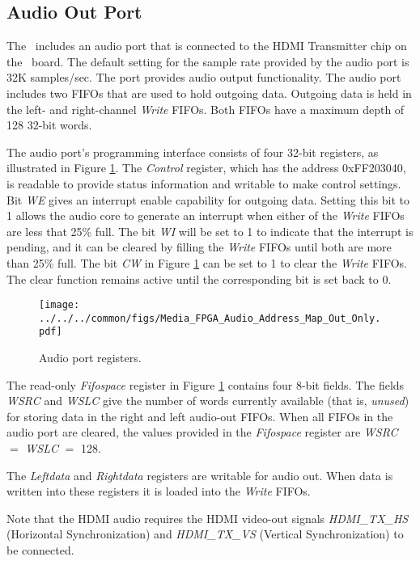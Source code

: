 \subsection{Audio Out Port}

The \systemName~includes an audio port that is connected to the HDMI
Transmitter chip on the \DEBoard~board. The default setting for the 
sample rate provided by the audio port is 
32K samples/sec.  The port provides audio output functionality.  
The audio port includes two FIFOs that are used to hold outgoing data.
Outgoing data is held in the left- and right-channel {\it Write} FIFOs. Both FIFOs have a maximum 
depth of 128 32-bit words.

The audio port's programming interface consists of four 32-bit registers, as illustrated in 
Figure \ref{fig:audio_port}.  The {\it Control} register, which has the address 
{\sf 0xFF203040}, is readable to provide status information and writable to make control
settings. 
Bit {\it WE} gives an interrupt enable capability for outgoing data. Setting this bit to 
1 allows the audio core to generate an interrupt when either of the {\it Write} FIFOs are
less that 25\% full. The bit {\it WI} will be set to 1 to indicate that the interrupt 
is pending, and it can be cleared by filling the {\it Write} FIFOs until both 
are more than 25\% full.  The bit {\it CW} in Figure \ref{fig:audio_port} can 
be set to 1 to clear the {\it Write} FIFOs. The clear function 
remains active until the corresponding bit is set back to 0.

\begin{figure}[h!]
   \begin{center}
       \texttt{[image: ../../../common/figs/Media\_FPGA\_Audio\_Address\_Map\_Out\_Only.pdf]}
   \end{center}
   \caption{Audio port registers.}
	\label{fig:audio_port}
\end{figure}

The read-only {\it Fifospace} register in Figure \ref{fig:audio_port} contains four 8-bit fields.
The fields {\it WSRC} and {\it WSLC} give 
the number of words currently available (that is, {\it unused}) for storing data in the right 
and left audio-out FIFOs. When all FIFOs in the audio port are cleared, the values provided 
in the {\it Fifospace} register are {\it WSRC} $=$ {\it WSLC} $=$ 128.

The {\it Leftdata} and {\it Rightdata} registers are writable
for audio out. When data is written into these registers it is loaded into the {\it
Write} FIFOs.

Note that the HDMI audio requires the HDMI video-out signals 
\textit{HDMI\_TX\_HS} (Horizontal Synchronization) and 
\textit{HDMI\_TX\_VS} (Vertical Synchronization) to be connected.

